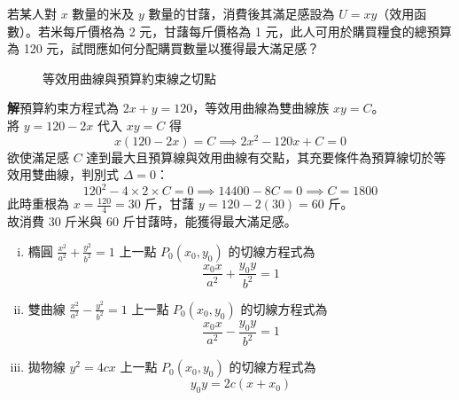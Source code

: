 \begin{example}
若某人對 $x$ 數量的米及 $y$ 數量的甘藷，消費後其滿足感設為 $U = xy$（效用函數）。若米每斤價格為 2 元，甘藷每斤價格為 1 元，此人可用於購買糧食的總預算為 120 元，試問應如何分配購買數量以獲得最大滿足感？

\begin{figure}[htbp]
\centering
{}
\caption{等效用曲線與預算約束線之切點}
\label{fig:b4-3-30}
\end{figure}

\textbf{解}\quad 預算約束方程式為 $2x + y = 120$，等效用曲線為雙曲線族 $xy = C$。\\
將 $y = 120 - 2x$ 代入 $xy = C$ 得
\[ x(120 - 2x) = C \implies 2x^2 - 120x + C = 0 \]
欲使滿足感 $C$ 達到最大且預算線與效用曲線有交點，其充要條件為預算線切於等效用雙曲線，判別式 $\Delta = 0$：
\[ 120^2 - 4 \times 2 \times C = 0 \implies 14400 - 8C = 0 \implies C = 1800 \]
此時重根為 $x = \frac{120}{4} = 30$ 斤，甘藷 $y = 120 - 2(30) = 60$ 斤。\\
故消費 30 斤米與 60 斤甘藷時，能獲得最大滿足感。
\end{example}

\begin{theorem}[錐線上一點之切線方程式]
\begin{enumerate}[(i)]
  \item 橢圓 $\frac{x^2}{a^2} + \frac{y^2}{b^2} = 1$ 上一點 $P_0(x_0, y_0)$ 的切線方程式為
  \begin{equation}
  \frac{x_0 x}{a^2} + \frac{y_0 y}{b^2} = 1 \label{eq:b4-3-4-tan-ellipse}
  \end{equation}
  \item 雙曲線 $\frac{x^2}{a^2} - \frac{y^2}{b^2} = 1$ 上一點 $P_0(x_0, y_0)$ 的切線方程式為
  \begin{equation}
  \frac{x_0 x}{a^2} - \frac{y_0 y}{b^2} = 1 \label{eq:b4-3-4-tan-hyper}
  \end{equation}
  \item 拋物線 $y^2 = 4cx$ 上一點 $P_0(x_0, y_0)$ 的切線方程式為
  \begin{equation}
  y_0 y = 2c(x + x_0) \label{eq:b4-3-4-tan-para}
  \end{equation}
\end{enumerate}
\end{theorem}

